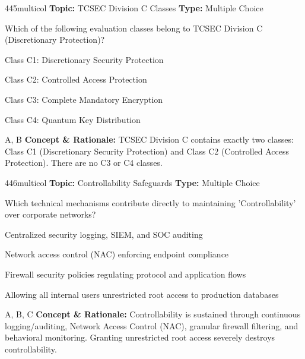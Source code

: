 \begin{qcard}{445}{multicol}
\textcolor{darkslate!75}{\small\textbf{Topic:} TCSEC Division C Classes \hfill \textbf{Type:} Multiple Choice}\vspace{0.4em}\par
Which of the following evaluation classes belong to TCSEC Division C (Discretionary Protection)?
\begin{qoptions}
\item Class C1: Discretionary Security Protection
\item Class C2: Controlled Access Protection
\item Class C3: Complete Mandatory Encryption
\item Class C4: Quantum Key Distribution
\end{qoptions}
\end{qcard}
\nopagebreak
\begin{explainbox}{A, B}
\textbf{Concept \& Rationale:} TCSEC Division C contains exactly two classes: Class C1 (Discretionary Security Protection) and Class C2 (Controlled Access Protection). There are no C3 or C4 classes.
\end{explainbox}

\begin{qcard}{446}{multicol}
\textcolor{darkslate!75}{\small\textbf{Topic:} Controllability Safeguards \hfill \textbf{Type:} Multiple Choice}\vspace{0.4em}\par
Which technical mechanisms contribute directly to maintaining 'Controllability' over corporate networks?
\begin{qoptions}
\item Centralized security logging, SIEM, and SOC auditing
\item Network access control (NAC) enforcing endpoint compliance
\item Firewall security policies regulating protocol and application flows
\item Allowing all internal users unrestricted root access to production databases
\end{qoptions}
\end{qcard}
\nopagebreak
\begin{explainbox}{A, B, C}
\textbf{Concept \& Rationale:} Controllability is sustained through continuous logging/auditing, Network Access Control (NAC), granular firewall filtering, and behavioral monitoring. Granting unrestricted root access severely destroys controllability.
\end{explainbox}

